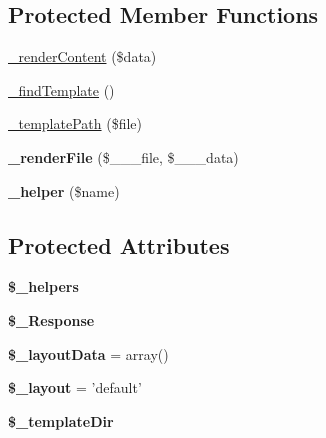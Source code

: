 \subsection*{Protected Member Functions}
\begin{DoxyCompactItemize}
\item 
\hyperlink{classView_afd382c9e42d6c24b8a064b615db7a898}{\_\-renderContent} (\$data)
\item 
\hyperlink{classView_a2cc8578430d33232105f4bab57978e7c}{\_\-findTemplate} ()
\item 
\hyperlink{classView_a0ff5857aa83ff98b3eb7e6067469cd54}{\_\-templatePath} (\$file)
\item 
\hypertarget{classView_ab0a86a216c1ad07e4580a4574f9b32e9}{
{\bfseries \_\-renderFile} (\$\_\-\_\-\_\-file, \$\_\-\_\-\_\-data)}
\label{classView_ab0a86a216c1ad07e4580a4574f9b32e9}

\item 
\hypertarget{classView_abe4a1f48ac5a9a9ebfd7a9292a8db663}{
{\bfseries \_\-helper} (\$name)}
\label{classView_abe4a1f48ac5a9a9ebfd7a9292a8db663}

\end{DoxyCompactItemize}
\subsection*{Protected Attributes}
\begin{DoxyCompactItemize}
\item 
\hypertarget{classView_a9896fc61a6f4aebec58668abf395db23}{
{\bfseries \$\_\-helpers}}
\label{classView_a9896fc61a6f4aebec58668abf395db23}

\item 
\hypertarget{classView_ad18c95369471c2fb61d0741b8d4040de}{
{\bfseries \$\_\-Response}}
\label{classView_ad18c95369471c2fb61d0741b8d4040de}

\item 
\hypertarget{classView_afdee45797fa2902521e300d19383cec8}{
{\bfseries \$\_\-layoutData} = array()}
\label{classView_afdee45797fa2902521e300d19383cec8}

\item 
\hypertarget{classView_a78921c86c8bc1798465462b9f0704e09}{
{\bfseries \$\_\-layout} = 'default'}
\label{classView_a78921c86c8bc1798465462b9f0704e09}

\item 
\hypertarget{classView_aa46abe6eae0fa132506c23fa782c1d5e}{
{\bfseries \$\_\-templateDir}}
\label{classView_aa46abe6eae0fa132506c23fa782c1d5e}

\end{DoxyCompactItemize}


